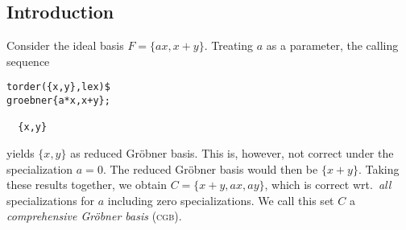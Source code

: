 %
%
% 


\subsection{Introduction}
Consider the ideal basis $F=\{ax,x+y\}$. Treating $a$ as a parameter,
the calling sequence
\begin{verbatim}
torder({x,y},lex)$
groebner{a*x,x+y};

  {x,y}
\end{verbatim}
yields $\{x,y\}$ as reduced Gr\"obner basis. This is, however, not
correct under the specialization $a=0$. The reduced Gr\"obner basis
would then be $\{x+y\}$. Taking these results together, we obtain
$C=\{x+y,ax,ay\}$, which is correct wrt.~\emph{all} specializations for
$a$ including zero specializations. We call this set $C$ a {\em
comprehensive Gr\"obner basis} (\textsc{cgb}).

